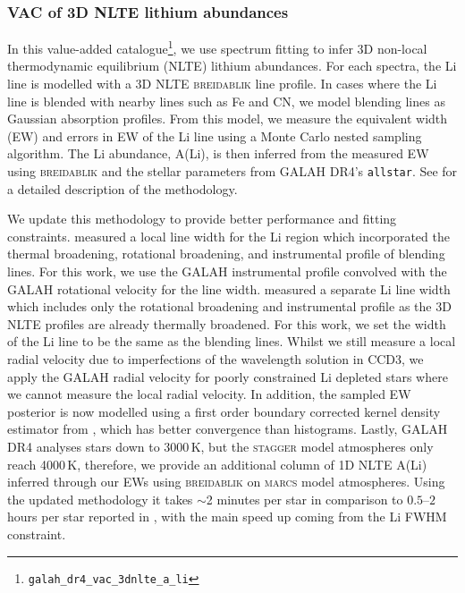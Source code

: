 \documentclass[
  journal=pasa,
  manuscript=research-paper, %
  year=2024,
  volume=37
]{cup-journal}
\newcommand{\marcs}{\textsc{marcs}\xspace}
\newcommand{\breidablik}{\textsc{breidablik}\xspace}
\newcommand{\stagger}{\textsc{stagger}\xspace}
\begin{document}
\subsubsection{VAC of 3D NLTE lithium abundances}

In this value-added catalogue\footnote{\texttt{galah\_dr4\_vac\_3dnlte\_a\_li}}, we use spectrum fitting to infer 3D non-local thermodynamic equilibrium (NLTE) lithium abundances. For each spectra, the Li line is modelled with a 3D NLTE \breidablik line profile. In cases where the Li line is blended with nearby lines such as Fe and CN, we model blending lines as Gaussian absorption profiles. From this model, we measure the equivalent width (EW) and errors in EW of the Li line using a Monte Carlo nested sampling algorithm. The Li abundance, A(Li), is then inferred from the measured EW using \breidablik and the stellar parameters from GALAH DR4's \texttt{allstar}. See \citet{Wang2024} for a detailed description of the methodology. 

We update this methodology to provide better performance and fitting constraints. 
\citet{Wang2024} measured a local line width for the Li region which incorporated the thermal broadening, rotational broadening, and instrumental profile of blending lines. For this work, we use the GALAH instrumental profile convolved with the GALAH rotational velocity for the line width. \citet{Wang2024} measured a separate Li line width which includes only the rotational broadening and instrumental profile as the 3D NLTE profiles are already thermally broadened. For this work, we set the width of the Li line to be the same as the blending lines. 
Whilst we still measure a local radial velocity due to imperfections of the wavelength solution in CCD3, we apply the GALAH radial velocity for poorly constrained Li depleted stars where we cannot measure the local radial velocity. In addition, the sampled EW posterior is now modelled using a first order boundary corrected kernel density estimator from \citet{Lewis2019}, which has better convergence than histograms. Lastly, GALAH DR4 analyses stars down to 3000\,K, but the \stagger model atmospheres only reach 4000\,K, therefore, we provide an additional column of 1D NLTE A(Li) inferred through our EWs using \breidablik on \marcs model atmospheres. Using the updated methodology it takes $\sim$2 minutes per star in comparison to $0.5$--$2$ hours per star reported in \citet{Wang2024}, with the main speed up coming from the Li FWHM constraint. 
\end{document}
